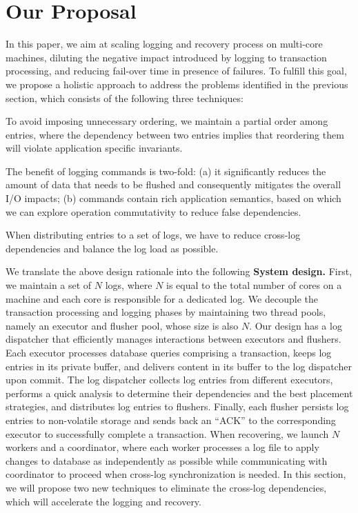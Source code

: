 \vspace{-.5em}
\section{Our Proposal}
\vspace{-.5em}
In this paper, we aim at scaling logging and recovery process on multi-core machines, diluting the negative impact introduced by logging to transaction processing, and reducing fail-over time in presence of failures. To fulfill this goal, we propose a holistic approach to address the problems identified in the previous section, which consists of the following three techniques:

 To avoid imposing unnecessary ordering, we maintain a partial order among entries, where the dependency between two entries implies that reordering them will violate application specific invariants. 

 The benefit of logging commands is two-fold: (a) it significantly reduces the amount of data that needs to be flushed and consequently mitigates the overall I/O impacts; (b) commands contain rich application semantics, based on which we can explore operation commutativity to reduce false dependencies.

 When distributing entries to a set of logs, we have to reduce cross-log dependencies and balance the log load as possible. 

We translate the above design rationale into the following {\bf System design.} First, we maintain a set of $N$ logs, where $N$ is equal to the total number of cores on a machine and each core is responsible for a dedicated log. We decouple the transaction processing and logging phases by maintaining two thread pools, namely an executor and flusher pool, whose size is also $N$. Our design has a log dispatcher that efficiently manages interactions between executors and flushers. Each executor processes database queries comprising a transaction, keeps log entries in its private buffer, and delivers content in its buffer to the log dispatcher upon commit. The log dispatcher collects log entries from different executors, performs a quick analysis to determine their dependencies and the best placement strategies, and distributes log entries to flushers. Finally, each flusher persists log entries to non-volatile storage and sends back an ``ACK'' to the corresponding executor to successfully complete a transaction.
When recovering, we launch $N$ workers and a coordinator, where each worker processes a log file to apply changes to database as independently as possible while communicating with coordinator to proceed when cross-log synchronization is needed.
In this section, we will propose two new techniques to eliminate the cross-log dependencies, which will accelerate the logging and recovery.

